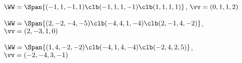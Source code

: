 \begin{exercise}
\begin{Parts}
\begin{reduce}
\item \(\WW=\Span\{(-1,1,-1,1)\clb(-1,1,1,-1)\clb( 1,1,1,1)\}\), \(\vv=(0,1,1,2)\)

\item \(\WW=\Span\{(2,-2,-4,-5)\clb(-4,4,1,-4)\clb(2,-1,4,-2)\}\), \(\vv=(2,-3,1,0)\)
\end{reduce}

\item \(\WW=\Span\{(1,4,-2,-2)\clb (-4,1,4,-4)\clb (-2,4,2,5)\}\), \(\vv=(-2,-4,3,-1)\)

%
\end{Parts}  
\end{exercise}





